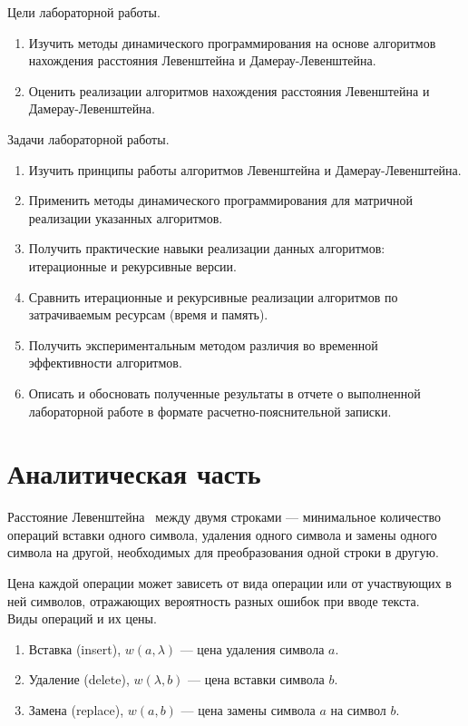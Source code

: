 \documentclass[12pt]{report}
\begin{document}
    Цели лабораторной работы.
    \begin{enumerate}
        \item Изучить методы динамического программирования на основе алгоритмов нахождения расстояния
        Левенштейна и Дамерау-Левенштейна.
        \item Оценить реализации алгоритмов нахождения расстояния Левенштейна и Дамерау-Левенштейна.
    \end{enumerate}

    Задачи лабораторной работы.
    \begin{enumerate}
        \item Изучить принципы работы алгоритмов Левенштейна и Дамерау-Левенштейна.
        \item Применить методы динамического программирования для матричной реализации указанных алгоритмов.
        \item Получить практические навыки реализации данных алгоритмов: итерационные и рекурсивные версии.
        \item Сравнить итерационные и рекурсивные реализации алгоритмов по затрачиваемым ресурсам (время и память).
        \item Получить экспериментальным методом различия во временной эффективности алгоритмов.
        \item Описать и обосновать полученные результаты в отчете о выполненной лабораторной работе
        в формате расчетно-пояснительной записки.
    \end{enumerate}

    \newpage


    \chapter{Аналитическая часть}

    Расстояние Левенштейна~\cite{levenshtein} между двумя строками ---
    минимальное количество операций вставки одного символа, удаления одного символа
    и замены одного символа на другой, необходимых для преобразования одной строки в другую.

    Цена каждой операции может зависеть от вида операции или от участвующих в ней символов, отражающих вероятность
    разных ошибок при вводе текста.
    \\
    Виды операций и их цены.
    \begin{enumerate}
        \item Вставка (insert), $w(a,\lambda)$ --- цена удаления символа $a$.
        \item Удаление (delete), $w(\lambda, b)$ --- цена вставки символа $b$.
        \item Замена (replace), $w(a, b)$ --- цена замены символа $a$ на символ $b$.
    \end{enumerate}
\end{document}
